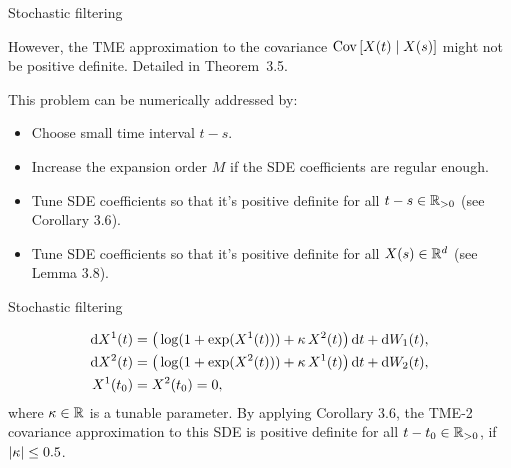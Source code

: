 \documentclass[seriffont, cmap=Beijing, 10pt]{zz}
\begin{document}
\begin{frame}{Stochastic filtering}
	\begin{block}{}
		However, the TME approximation to the \alert{covariance} $\cov{X(t) \cond X(s)}$ might not be \alert{positive definite}. Detailed in \alert{Theorem~3.5}.
	\end{block}
	\begin{block}{}
		This problem can be numerically addressed by:
		\begin{itemize}
			\item Choose small \alert{time interval} $t-s$.
			\item Increase the expansion \alert{order} $M$ if the SDE coefficients are regular enough.
			\item Tune SDE coefficients so that it's positive definite for all $t-s\in\mathbb{R}_{>0}$ (see \alert{Corollary 3.6}).
			\item Tune SDE coefficients so that it's positive definite for all $X(s)\in\mathbb{R}^d$ (see \alert{Lemma 3.8}).
		\end{itemize}
	\end{block}
\end{frame}

\begin{frame}{Stochastic filtering}
	\begin{block}{}
		\begin{example}
			\begin{equation}
				\begin{split}
					\mathop{}\!\mathrm{d} X^1(t) &= \big( \log(1+\exp(X^1(t))) + \kappa\,X^2(t) \big)\mathop{}\!\mathrm{d} t + \mathop{}\!\mathrm{d} W_1(t),\\
					\mathop{}\!\mathrm{d} X^2(t) &= \big( \log(1+\exp(X^2(t))) + \kappa\,X^1(t) \big)\mathop{}\!\mathrm{d} t + \mathop{}\!\mathrm{d} W_2(t),\\
					X^1(t_0)&=X^2(t_0)=0,
				\end{split}
			\end{equation}
			where $\kappa\in\mathbb{R}$ is a \alert{tunable} parameter. By applying \alert{Corollary 3.6}, the TME-2 covariance approximation to this SDE is positive definite for \alert{all} $t-t_0\in\mathbb{R}_{>0}$, if \alert{$\lvert\kappa\rvert\leq0.5$}.
		\end{example}
	\end{block}
\end{frame}

\end{document}
